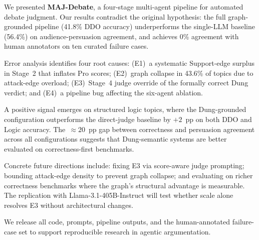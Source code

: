 \documentclass[11pt,twocolumn,letterpaper]{article}
\newcommand{\sys}{\textbf{MAJ-Debate}}
\newcommand{\BaselineDDO}{56.4}
\newcommand{\FullDDO}{41.8}
\newcommand{\LargeModel}{Llama-3.1-405B-Instruct}
\begin{document}
We presented \sys{}, a four-stage multi-agent pipeline for automated
debate judgment.
Our results contradict the original hypothesis: the full graph-grounded
pipeline (\FullDDO\% DDO accuracy) underperforms the single-LLM baseline
(\BaselineDDO\%) on audience-persuasion agreement, and achieves 0\%
agreement with human annotators on ten curated failure cases.

Error analysis identifies four root causes:
(E1)~a systematic Support-edge surplus in Stage~2 that inflates Pro scores;
(E2)~graph collapse in 43.6\% of topics due to attack-edge overload;
(E3)~Stage~4 judge override of the formally correct Dung verdict; and
(E4)~a pipeline bug affecting the six-agent ablation.

A positive signal emerges on structured logic topics, where the
Dung-grounded configuration outperforms the direct-judge baseline by
$+2$~pp on both DDO and Logic accuracy.
The~${\approx}20$~pp gap between correctness and persuasion agreement
across all configurations suggests that Dung-semantic systems are better
evaluated on correctness-first benchmarks.

Concrete future directions include: fixing E3 via score-aware judge
prompting; bounding attack-edge density to prevent graph collapse; and
evaluating on richer correctness benchmarks where the graph's structural
advantage is measurable.
The replication with \LargeModel{} will test whether scale alone resolves
E3 without architectural changes.

We release all code, prompts, pipeline outputs, and the human-annotated
failure-case set to support reproducible research in agentic argumentation.



\end{document}
